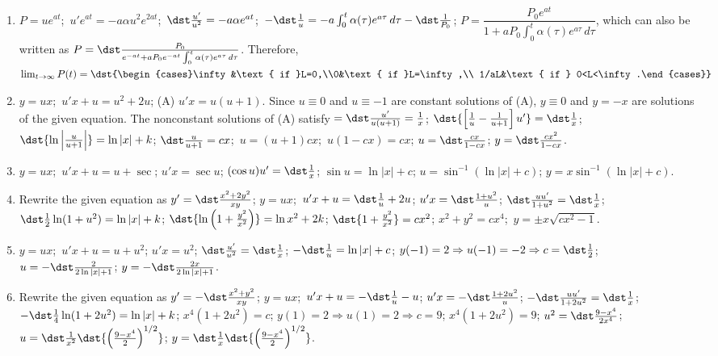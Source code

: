 \documentclass[openany]{book}
\newenvironment{sectionSolutions}{
 \begin{enumerate}[item-label={\thesection.\arabic{enumi}.}]
}{
 \end{enumerate}
}
\begin{document}
\begin{sectionSolutions}
\item
$P=ue^{at}$;\ $u'e^{at}=-a\alpha u^2e^{2at}$;\ $\dst\frac{u'}{
u^2}=-a\alpha e^{at}$;\ $-\dst\frac{1}{
u}=-a\int_0^t\alpha(\tau)e^{a\tau}\,d\tau-\dst\frac{1}{ P_0}$;\;
$P=\dfrac{P_0e^{at}}{1+aP_0\int_0^t\alpha(\tau)e^{a\tau}\,d\tau}$,
which can also be written as
$P=\dst\frac{P_0}{
e^{-at}+aP_0e^{-at}\int_0^t\alpha(\tau)e^{a\tau}\,d\tau}$.
Therefore, $\lim_{t\to\infty}P(t)=
\dst{\begin{cases}\infty&\text{ if }L=0,\\0&\text{ if
}L=\infty,\\ 1/aL&\text{ if } 0<L<\infty.\end{cases}}$

\item
$y=ux$;\ $u'x+u=u^2+2u$;\;
(A) $u'x=u(u+1)$. Since $u\equiv0$ and $u\equiv-1$ are constant
solutions of (A), $y\equiv0$ and $y=-x$ are
solutions of the given equation. The nonconstant solutions of (A)
satisfy
$=\dst\frac{u'}{ u(u+1)}=\frac{1}{ x}$;\;
$\dst{\left[\frac{1}{ u}-\frac{1}{ u+1}\right]u'}=\dst\frac{1}{ x}$;\;
$\dst{\ln\left|\frac{u}{ u+1}\right|}=\ln|x|+k$;\;
$\dst\frac{u}{ u+1}=cx$;\ $u=(u+1)cx$;\ $u(1-cx)=cx$;\;
$u=\dst\frac{cx}{1-cx}$;\;
$y=\dst\frac{cx^2}{1-cx}$.

\item
$y=ux$;\ $u'x+u=u+\sec$;\;
$u'x=\sec u$;\;
$(\cos u)u'=\dst\frac{1}{ x}$;\;
$\sin u=\ln|x|+c$;\;
$u=\sin^{-1}(\ln|x|+c)$;\;
$y=x\sin^{-1}(\ln|x|+c)$.



\item
Rewrite the given equation as $y'=\dst\frac{x^2+2y^2}{ xy}$;\;
$y=ux$;\ $u'x+u=\dst\frac{1}{ u}+2u$;\;
$u'x=\dst\frac{1+u^2}{ u}$;\;
$\dst\frac{uu'}{1+u^2}=\dst\frac{1}{ x}$;\;
$\dst\frac{1}{2}\ln(1+u^2)=\ln|x|+k$;\;
$\dst{\ln\left(1+\frac{y^2}{ x^2}\right)}=\ln x^2+2k$;\;
$\dst{1+\frac{y^2}{ x^2}}=cx^2$;\;
$x^2+y^2=cx^4$;\ $y=\pm x\sqrt{cx^2-1}$.



\item
$y=ux$;\ $u'x+u=u+u^2$;\;
$u'x=u^2$;\;
$\dst\frac{u'}{ u^2}=\dst\frac{1}{ x}$;\;
$-\dst\frac{1}{ u}=\ln|x|+c$;\;
$y(-1)=2\Rightarrow u(-1)=-2\Rightarrow c=\dst\frac{1}{2}$;\;
$u=-\dst\frac{2}{2\ln|x|+1}$;\;
$y=-\dst\frac{2x}{2\ln|x|+1}$.


\item
Rewrite the given equation as $y'=-\dst\frac{x^2+y^2}{ xy}$;\;
$y=ux$;\ $u'x+u=-\dst\frac{1}{ u}-u$;\;
$u'x=-\dst\frac{1+2u^2}{ u}$;\;
$-\dst\frac{uu'}{1+2u^2}=\dst\frac{1}{ x}$;\;
$-\dst\frac{1}{4}\ln(1+2u^2)=\ln|x|+k$;\;
$x^4(1+2u^2)=c$;\;
$y(1)=2\Rightarrow u(1)=2\Rightarrow c=9$;\;
$x^4(1+2u^2)=9$;\;
$u^2=\dst\frac{9-x^4}{2x^4}$;\;
$u=\dst\frac{1}{ x^2}\dst{\left(\frac{9-x^4}{2}\right)^{1/2}}$;\;
$y=\dst\frac{1}{ x}\dst{\left(\frac{9-x^4}{2}\right)^{1/2}}$.


\end{sectionSolutions}
\end{document}
